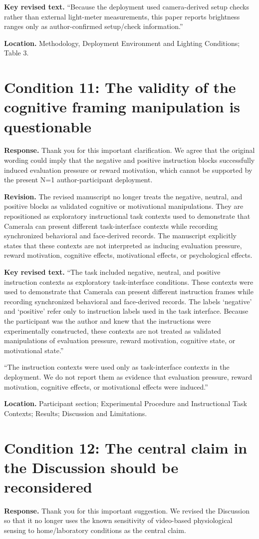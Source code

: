 \documentclass[11pt]{article}
\newcommand{\condition}[2]{\section*{Condition #1: #2}}
\begin{document}
\textbf{Key revised text.}
``Because the deployment used camera-derived setup checks rather than external light-meter measurements, this paper reports brightness ranges only as author-confirmed setup/check information.''

\textbf{Location.}
Methodology, Deployment Environment and Lighting Conditions; Table 3.

\condition{11}{The validity of the cognitive framing manipulation is questionable}
\textbf{Response.}
Thank you for this important clarification.
We agree that the original wording could imply that the negative and positive instruction blocks successfully induced evaluation pressure or reward motivation, which cannot be supported by the present N=1 author-participant deployment.

\textbf{Revision.}
The revised manuscript no longer treats the negative, neutral, and positive blocks as validated cognitive or motivational manipulations.
They are repositioned as exploratory instructional task contexts used to demonstrate that Camerala can present different task-interface contexts while recording synchronized behavioral and face-derived records.
The manuscript explicitly states that these contexts are not interpreted as inducing evaluation pressure, reward motivation, cognitive effects, motivational effects, or psychological effects.

\textbf{Key revised text.}
``The task included negative, neutral, and positive instruction contexts as exploratory task-interface conditions.
These contexts were used to demonstrate that Camerala can present different instruction frames while recording synchronized behavioral and face-derived records.
The labels `negative' and `positive' refer only to instruction labels used in the task interface.
Because the participant was the author and knew that the instructions were experimentally constructed, these contexts are not treated as validated manipulations of evaluation pressure, reward motivation, cognitive state, or motivational state.''

``The instruction contexts were used only as task-interface contexts in the deployment.
We do not report them as evidence that evaluation pressure, reward motivation, cognitive effects, or motivational effects were induced.''

\textbf{Location.}
Participant section; Experimental Procedure and Instructional Task Contexts; Results; Discussion and Limitations.

\condition{12}{The central claim in the Discussion should be reconsidered}
\textbf{Response.}
Thank you for this important suggestion.
We revised the Discussion so that it no longer uses the known sensitivity of video-based physiological sensing to home/laboratory conditions as the central claim.
\end{document}

